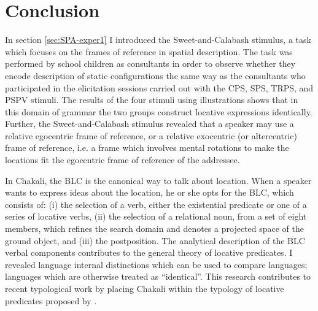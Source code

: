 \section{Conclusion}
\label{sec:SPA-conclusion}

In section \ref{sec:SPA-exper1} I introduced the  Sweet-and-Calabash stimulus,
a task which focuses on the  frames of reference in spatial description. The
task was performed by school children as consultants in order to observe whether
they encode description of static configurations the same way  as the
consultants who participated in the elicitation sessions carried out with
the CPS,  SPS, TRPS, and PSPV stimuli.  The results of the four stimuli using
illustrations shows that in this domain of grammar the two groups construct
locative expressions identically. Further, the Sweet-and-Calabash stimulus
revealed that a speaker may use a relative egocentric frame of reference, or  a
relative exocentric (or altercentric) frame of reference, i.e.  a frame which
involves mental rotations to make the locations fit the egocentric frame of
reference of the addressee.

In Chakali, the BLC is the canonical way to talk about location. When a speaker
wants to express ideas about the location, he or she opts for the BLC,  which
consists of: (i) the selection of a verb, either the existential predicate or
one of a series of locative verbs, (ii) the selection of a relational noun,
 from a set of eight members, which refines the search domain and denotes a
projected space of the ground object, and (iii) the postposition. The analytical
description of the BLC verbal components contributes to the general theory of
locative predicates. I revealed language internal distinctions which can be
used to compare languages;  languages which are otherwise treated as
``identical''. This research contributes  to recent typological work by placing
Chakali within the typology of locative predicates proposed by \cite{Amek07b}.



